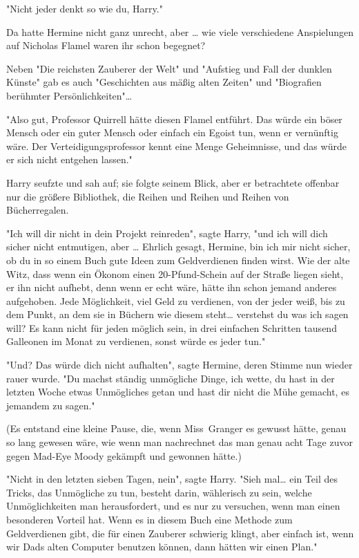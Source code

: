 {"Nicht jeder denkt so wie du, Harry."

Da hatte Hermine nicht ganz unrecht, aber … wie viele verschiedene Anspielungen auf Nicholas Flamel waren ihr schon begegnet?

Neben "Die reichsten Zauberer der Welt" und "Aufstieg und Fall der dunklen Künste" gab es auch "Geschichten aus mäßig alten Zeiten" und "Biografien berühmter Persönlichkeiten"…

"Also gut, Professor Quirrell hätte diesen Flamel entführt. Das würde ein böser Mensch oder ein guter Mensch oder einfach ein Egoist tun, wenn er vernünftig wäre. Der Verteidigungsprofessor kennt eine Menge Geheimnisse, und das würde er sich nicht entgehen lassen."

Harry seufzte und sah auf; sie folgte seinem Blick, aber er betrachtete offenbar nur die größere Bibliothek, die Reihen und Reihen und Reihen von Bücherregalen.

"Ich will dir nicht in dein Projekt reinreden", sagte Harry, "und ich will dich sicher nicht entmutigen, aber … Ehrlich gesagt, Hermine, bin ich mir nicht sicher, ob du in so einem Buch gute Ideen zum Geldverdienen finden wirst. Wie der alte Witz, dass wenn ein Ökonom einen 20-Pfund-Schein auf der Straße liegen sieht, er ihn nicht aufhebt, denn wenn er echt wäre, hätte ihn schon jemand anderes aufgehoben. Jede Möglichkeit, viel Geld zu verdienen, von der jeder weiß, bis zu dem Punkt, an dem sie in Büchern wie diesem steht… verstehst du was ich sagen will? Es kann nicht für jeden möglich sein, in drei einfachen Schritten tausend Galleonen im Monat zu verdienen, sonst würde es jeder tun."

"Und? Das würde dich nicht aufhalten", sagte Hermine, deren Stimme nun wieder rauer wurde. "Du machst ständig unmögliche Dinge, ich wette, du hast in der letzten Woche etwas Unmögliches getan und hast dir nicht die Mühe gemacht, es jemandem zu sagen."

(Es entstand eine kleine Pause, die, wenn Miss~Granger es gewusst hätte, genau so lang gewesen wäre, wie wenn man nachrechnet das man genau acht Tage zuvor gegen Mad-Eye Moody gekämpft und gewonnen hätte.)

"Nicht in den letzten sieben Tagen, nein", sagte Harry. "Sieh mal… ein Teil des Tricks, das Unmögliche zu tun, besteht darin, wählerisch zu sein, welche Unmöglichkeiten man herausfordert, und es nur zu versuchen, wenn man einen besonderen Vorteil hat. Wenn es in diesem Buch eine Methode zum Geldverdienen gibt, die für einen Zauberer schwierig klingt, aber einfach ist, wenn wir Dads alten Computer benutzen können, dann hätten wir einen Plan."

}
